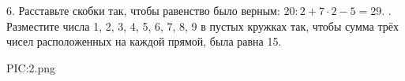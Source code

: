 6. Расставьте скобки так, чтобы равенство было верным: $20:2+7\cdot2-5=29.$
\newpage
{}. Разместите числа 1, 2, 3, 4, 5, 6, 7, 8, 9 в пустых кружках так, чтобы сумма трёх чисел расположенных на каждой прямой, была равна 15.
\begin{center}
{{PIC:2.png}}
\end{center}

